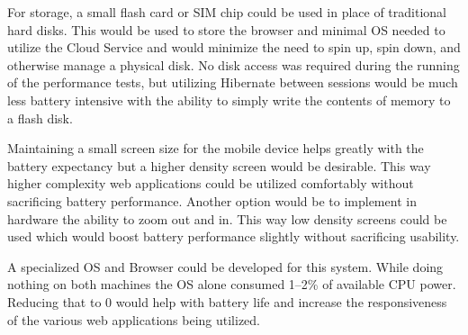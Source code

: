 For storage, a small flash card or SIM chip could be used in place of
traditional hard disks.  This would be used to store the browser and minimal OS
needed to utilize the Cloud Service and would minimize the need to spin up, spin
down, and otherwise manage a physical disk.  No disk access was required during
the running of the performance tests, but utilizing Hibernate between sessions
would be much less battery intensive with the ability to simply write the
contents of memory to a flash disk.

Maintaining a small screen size for the mobile device helps greatly with the
battery expectancy but a higher density screen would be desirable.  This way
higher complexity web applications could be utilized comfortably without
sacrificing battery performance.  Another option would be to implement in
hardware the ability to zoom out and in.  This way low density screens could be
used which would boost battery performance slightly without sacrificing
usability.

A specialized OS and Browser could be developed for this system.  While doing
nothing on both machines the OS alone consumed 1--2\% of available CPU power.
Reducing that to 0 would help with battery life and increase the responsiveness
of the various web applications being utilized.
